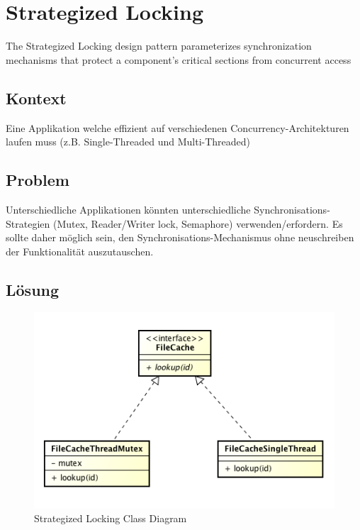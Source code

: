 \section{Strategized Locking}

The Strategized Locking design pattern parameterizes synchronization mechanisms that protect a component's critical sections from concurrent access

\subsection{Kontext}

Eine Applikation welche effizient auf verschiedenen Concurrency-Architekturen laufen muss (z.B. Single-Threaded und Multi-Threaded)

\subsection{Problem}

Unterschiedliche Applikationen könnten unterschiedliche Synchronisations-Strategien (Mutex, Reader/Writer lock, Semaphore) verwenden/erfordern. Es sollte daher möglich sein, den Synchronisations-Mechanismus ohne neuschreiben der Funktionalität auszutauschen.

\subsection{Lösung}

\begin{figure}[H]
	\centering
	\includegraphics[width=12cm]{content/posa2/strategized-locking/images/Screen_Shot_2013-05-07.png}
	\caption{Strategized Locking Class Diagram}
\end{figure}

